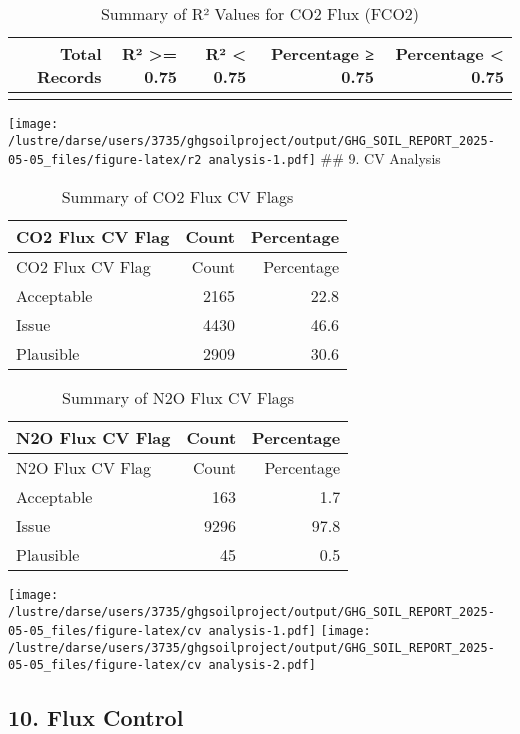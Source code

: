 \documentclass[
]{article}
\begin{document}
\begin{longtable}[t]{rrrrr}
\caption{\label{tab:r2 analysis}Summary of R² Values for CO2 Flux (FCO2)}\\
\toprule
Total Records & R² >= 0.75 & R² < 0.75 & Percentage ≥ 0.75 & Percentage < 0.75\\
\midrule
\cellcolor{gray!10}{9504} & \cellcolor{gray!10}{7669} & \cellcolor{gray!10}{1835} & \cellcolor{gray!10}{80.7} & \cellcolor{gray!10}{19.3}\\
\bottomrule
\end{longtable}

\texttt{[image: /lustre/darse/users/3735/ghgsoilproject/output/GHG\_SOIL\_REPORT\_2025-05-05\_files/figure-latex/r2 analysis-1.pdf]}
\#\# 9. CV Analysis

\begin{longtable}[]{@{}lrr@{}}
\caption{Summary of CO2 Flux CV Flags}\tabularnewline
\toprule()
CO2 Flux CV Flag & Count & Percentage \\
\midrule()
\endfirsthead
\toprule()
CO2 Flux CV Flag & Count & Percentage \\
\midrule()
\endhead
Acceptable & 2165 & 22.8 \\
Issue & 4430 & 46.6 \\
Plausible & 2909 & 30.6 \\
\bottomrule()
\end{longtable}

\begin{longtable}[]{@{}lrr@{}}
\caption{Summary of N2O Flux CV Flags}\tabularnewline
\toprule()
N2O Flux CV Flag & Count & Percentage \\
\midrule()
\endfirsthead
\toprule()
N2O Flux CV Flag & Count & Percentage \\
\midrule()
\endhead
Acceptable & 163 & 1.7 \\
Issue & 9296 & 97.8 \\
Plausible & 45 & 0.5 \\
\bottomrule()
\end{longtable}

\texttt{[image: /lustre/darse/users/3735/ghgsoilproject/output/GHG\_SOIL\_REPORT\_2025-05-05\_files/figure-latex/cv analysis-1.pdf]}
\texttt{[image: /lustre/darse/users/3735/ghgsoilproject/output/GHG\_SOIL\_REPORT\_2025-05-05\_files/figure-latex/cv analysis-2.pdf]}

\hypertarget{flux-control}{%
\subsection{10. Flux Control}\label{flux-control}}
\end{document}

